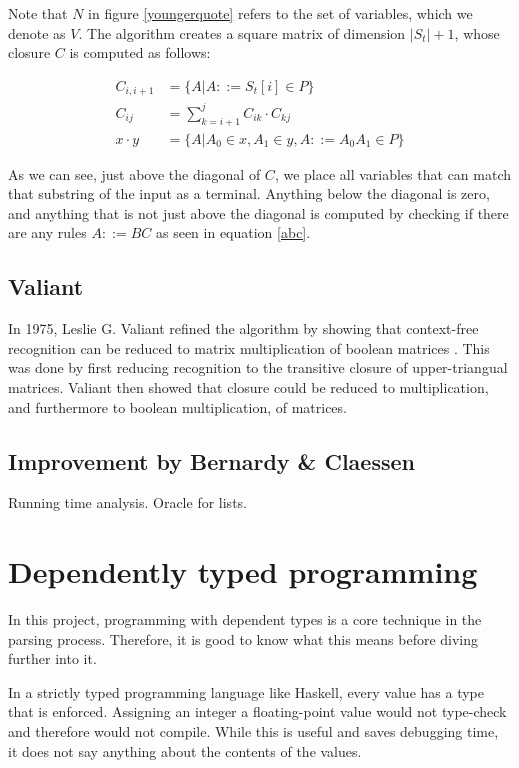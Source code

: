 \documentclass[a4paper,12pt,twosided]{report}
\begin{document}
Note that $N$ in figure \ref{youngerquote} refers to the set of variables, which
we denote as $V$. The algorithm creates a square matrix of dimension $|S_t|+1$,
whose closure $C$ is computed as follows:

\begin{align}
C_{i,i+1} &= \{ A | A ::= S_t[i] \in P \} \\
C_{ij}    &= \sum_{k=i+1}^{j} C_{ik} \cdot C_{kj} \\
x \cdot y &= \{ A | A_0 \in x, A_1 \in y, A ::= A_0A_1 \in P \} \label{abc}
\end{align}

As we can see, just above the diagonal of $C$, we place all variables that can
match that substring of the input as a terminal. Anything below the diagonal is
zero, and anything that is not just above the diagonal is computed by checking
if there are any rules $A ::= BC$ as seen in equation \ref{abc}.

\subsection{Valiant}
In 1975, Leslie G. Valiant refined the algorithm by showing that context-free
recognition can be reduced to matrix multiplication of boolean matrices
\cite{Valiant75}. This was done by first reducing recognition to the transitive
closure of upper-triangual matrices. Valiant then showed that closure could be
reduced to multiplication, and furthermore to boolean multiplication, of
matrices. 

\subsection{Improvement by Bernardy \& Claessen}
Running time analysis. Oracle for lists. 

\section{Dependently typed programming}
In this project, programming with dependent types is a core technique in the
parsing process. Therefore, it is good to know what this means before diving
further into it.

In a strictly typed programming language like Haskell, every value has a type
that is enforced. Assigning an integer a floating-point value would not
type-check and therefore would not compile. While this is useful and saves
debugging time, it does not say anything about the contents of the values.
\end{document}
